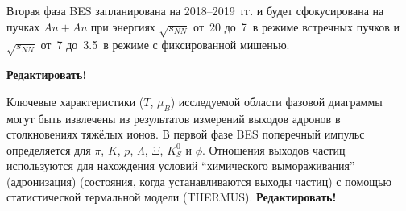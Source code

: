 
Вторая фаза BES запланирована на 2018--2019~гг. и будет сфокусирована на пучках $Au+Au$ при энергиях $\sqrt{s_{NN}}$ от~20 до~7~\GeVperNucl в режиме встречных пучков и $\sqrt{s_{NN}}$ от~7 до~3.5~\GeVperNucl в режиме с фиксированной мишенью.





\textbf{Редактировать!}

Ключевые характеристики ($T$, $\mu_{B}$) исследуемой области фазовой диаграммы могут быть извлечены из результатов измерений выходов адронов в столкновениях тяжёлых ионов. В первой фазе BES поперечный импульс определяется для $\pi$, $K$, $p$, $\Lambda$, $\Xi$, $K^{0}_{S}$ и $\phi$. Отношения выходов частиц используются для нахождения условий ``химического вымораживания'' (адронизация) (состояния, когда устанавливаются выходы частиц) с помощью статистической термальной модели (THERMUS).
\textbf{Редактировать!}



